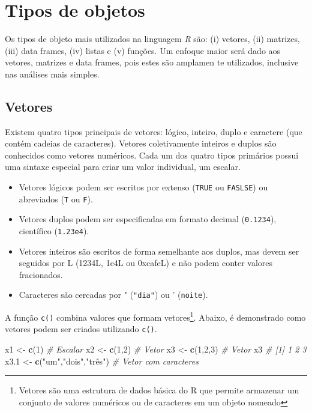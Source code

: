 \documentclass[
]{book}
\makeatletter
\newenvironment{Shaded}{\begin{snugshade}}{\end{snugshade}}
\newcommand{\CommentTok}[1]{\textcolor[rgb]{0.56,0.35,0.01}{\textit{#1}}}
\newcommand{\DecValTok}[1]{\textcolor[rgb]{0.00,0.00,0.81}{#1}}
\newcommand{\FloatTok}[1]{\textcolor[rgb]{0.00,0.00,0.81}{#1}}
\newcommand{\KeywordTok}[1]{\textcolor[rgb]{0.13,0.29,0.53}{\textbf{#1}}}
\newcommand{\NormalTok}[1]{#1}
\newcommand{\StringTok}[1]{\textcolor[rgb]{0.31,0.60,0.02}{#1}}
\numberwithin{equation}{section}
\newcommand{\indf}[1]{\index[function]{#1@\texttt{#1()}|ST}}
\newcommand{\indt}[1]{\index{#1|ST}}
\makeatother
\begin{document}
\hypertarget{objects}{%
\chapter{Tipos de objetos}\label{objects}}

Os tipos de objeto mais utilizados na linguagem \emph{R} são: (i) vetores, (ii) matrizes, (iii) data frames, (iv) listas e (v) funções. Um enfoque maior será dado aos vetores, matrizes e data frames, pois estes são amplamen
te utilizados, inclusive nas análises mais simples.

\hypertarget{vetores}{%
\section{Vetores}\label{vetores}}

Existem quatro tipos principais de vetores: lógico, inteiro, duplo e caractere (que contém cadeias de caracteres). Vetores coletivamente inteiros e duplos são conhecidos como vetores numéricos. Cada um dos quatro tipos primários possui uma sintaxe especial para criar um valor individual, um escalar.

\begin{itemize}
\item
  Vetores lógicos podem ser escritos por extenso (\texttt{TRUE} ou \texttt{FASLSE}) ou abreviados (\texttt{T} ou \texttt{F}).
\item
  Vetores duplos podem ser especificadas em formato decimal (\texttt{0.1234}), científico (\texttt{1.23e4}).
\item
  Vetores inteiros são escritos de forma semelhante aos duplos, mas devem ser seguidos por L (1234L, 1e4L ou 0xcafeL) e não podem conter valores fracionados.
\item
  Caracteres são cercadas por " (\texttt{"dia"}) ou ' (\texttt{\textquotesingle{}noite\textquotesingle{}}).
\end{itemize}

A função \texttt{c()} \indt{vetores} \indf{c} combina valores que formam vetores\footnote{Vetores são uma estrutura de dados básica do R que permite armazenar um conjunto de valores numéricos ou de caracteres em um objeto nomeado}. Abaixo, é demonstrado como vetores podem ser criados utilizando \texttt{c()}.

\begin{Shaded}
\begin{Highlighting}[]
\NormalTok{x1 \textless{}{-}}\StringTok{ }\KeywordTok{c}\NormalTok{(}\DecValTok{1}\NormalTok{) }\CommentTok{\# Escalar }
\NormalTok{x2 \textless{}{-}}\StringTok{ }\KeywordTok{c}\NormalTok{(}\DecValTok{1}\NormalTok{,}\DecValTok{2}\NormalTok{) }\CommentTok{\# Vetor}
\NormalTok{x3 \textless{}{-}}\StringTok{ }\KeywordTok{c}\NormalTok{(}\DecValTok{1}\NormalTok{,}\DecValTok{2}\NormalTok{,}\DecValTok{3}\NormalTok{) }\CommentTok{\# Vetor}
\NormalTok{x3}
\CommentTok{\# [1] 1 2 3}
\NormalTok{x3}\FloatTok{.1}\NormalTok{ \textless{}{-}}\StringTok{ }\KeywordTok{c}\NormalTok{(}\StringTok{"um"}\NormalTok{,}\StringTok{"dois"}\NormalTok{,}\StringTok{"três"}\NormalTok{) }\CommentTok{\# Vetor com caracteres}
\end{Highlighting}
\end{Shaded}
\end{document}
